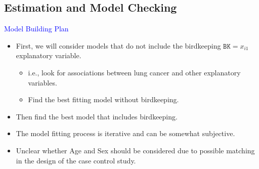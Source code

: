 \documentclass[oneside]{book}\usepackage[]{graphicx}\usepackage[svgnames]{xcolor}
\begin{document}
\subsection*{Estimation and Model Checking}
\textcolor{Blue}{Model Building Plan}
\begin{itemize}
      \item First, we will consider models that do not include the birdkeeping $ \texttt{BK}=x_{i1} $
            explanatory variable.
            \begin{itemize}
                  \item i.e., look for associations between lung cancer and other explanatory variables.
                  \item Find the best fitting model without birdkeeping.
            \end{itemize}
      \item Then find the best model that includes birdkeeping.
      \item The model fitting process is iterative and can be somewhat subjective.
      \item Unclear whether Age and Sex should be considered due to possible matching in
            the design of the case control study.
\end{itemize}
\end{document}

